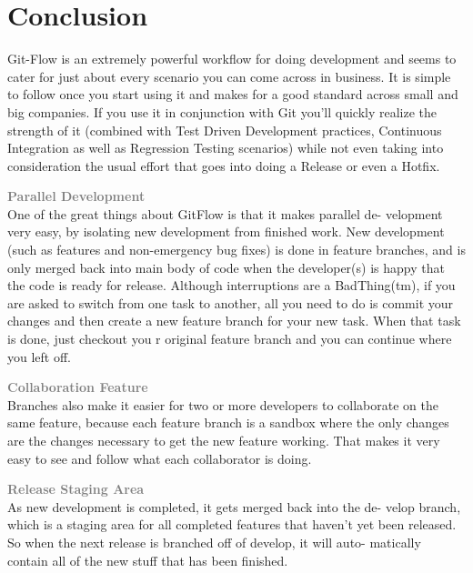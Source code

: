 \documentclass{tufte-handout}
\begin{document}
		\clearpage
		
		
		
		\section{Conclusion}
	
		
		Git-Flow is an extremely powerful workflow for doing development and
		seems to cater for just about every scenario you can come across in
		business. It is simple to follow once you start using it and makes for a
		good standard across small and big companies. If you use it in
		conjunction with Git you'll quickly realize the strength of it (combined
		with Test Driven Development practices, Continuous Integration as well
		as Regression Testing scenarios) while not even taking into
		consideration the usual effort that goes into doing a Release or even a
		Hotfix.
		\bigskip
		
		\textbf{\textcolor{gray}{Parallel Development}}\\
		One of the great things about GitFlow is that it makes parallel de- velopment very easy, by isolating new development from finished work. New development (such as features and non-emergency bug fixes) is done in feature branches, and is only merged back into main body of code when the developer(s) is happy that the code is ready for release. Although interruptions are a BadThing(tm), if you are asked to switch from one task to another, all you need to do is commit your changes and then create a new feature branch for your new task. When that task is done, just checkout you r original feature branch and you can continue where you left off.
		\medskip
		
		\textbf{\textcolor{gray}{Collaboration Feature}}\\
		Branches also make it easier for two or more
		developers to collaborate on the same feature, because each feature
		branch is a sandbox where the only changes are the changes necessary to get the new
		feature working. That makes it very easy to see and follow what each
		collaborator is doing.
		\medskip
		
		\textbf{\textcolor{gray}{Release Staging Area}}\\
		As new development is completed, it gets merged
		back into the de- velop branch, which is a staging area for all
		completed features that haven't yet been released. So when the next
		release is branched off of develop, it will auto- matically contain all
		of the new stuff that has been finished.
		\medskip
		
\end{document}
